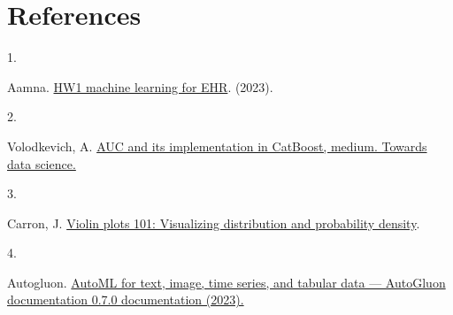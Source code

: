 \documentclass[
]{article}
\newlength{\cslhangindent}
\newlength{\csllabelwidth}
\newlength{\cslentryspacingunit} %
\newenvironment{CSLReferences}[2] %
 {%
  \setlength{\parindent}{0pt}
  \ifodd #1
  \let\oldpar\par
  \def\par{\hangindent=\cslhangindent\oldpar}
  \fi
  \setlength{\parskip}{#2\cslentryspacingunit}
 }%
 {}
\newcommand{\CSLLeftMargin}[1]{\parbox[t]{\csllabelwidth}{#1}}
\newcommand{\CSLRightInline}[1]{\parbox[t]{\linewidth - \csllabelwidth}{#1}\break}
\begin{document}
\newpage

\hypertarget{references}{%
\section*{References}\label{references}}

\hypertarget{refs}{}
\begin{CSLReferences}{0}{0}
\leavevmode{}%
\CSLLeftMargin{1. }%
\CSLRightInline{Aamna.
\href{https://kaggle.com/competitions/hw1-machine-learning-for-ehr}{HW1
machine learning for EHR}. (2023).}

\leavevmode{}%
\CSLLeftMargin{2. }%
\CSLRightInline{Volodkevich, A.
\href{\%20https://towardsdatascience.com/auc-and-its-implementation-in-catboost-6bc740c01f98\%20(Accessed:\%20March\%2013,\%202023)}{AUC
and its implementation in CatBoost, medium. Towards data science.}}

\leavevmode{}%
\CSLLeftMargin{3. }%
\CSLRightInline{Carron, J.
\href{https://mode.com/blog/violin-plot-examples/\%20(Accessed:\%20March\%2013,\%202023)}{Violin
plots 101: Visualizing distribution and probability density}.}

\leavevmode{}%
\CSLLeftMargin{4. }%
\CSLRightInline{Autogluon.
\href{https://auto.gluon.ai/stable/index.html\%20(Accessed:\%2013\%20March\%202023).}{AutoML
for text, image, time series, and tabular data --- AutoGluon
documentation 0.7.0 documentation (2023).}}

\end{CSLReferences}
\end{document}
